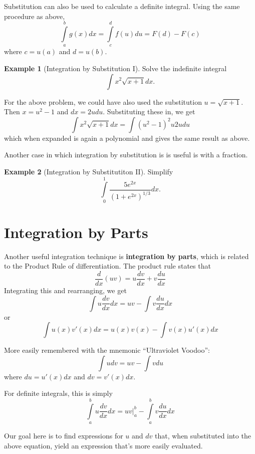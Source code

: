 \documentclass[
]{book}
\theoremstyle{definition}
\theoremstyle{definition}
\newtheorem{example}{Example}[chapter]
\theoremstyle{definition}
\theoremstyle{remark}
\begin{document}
Substitution can also be used to calculate a definite integral. Using the same procedure as above, \[\int\limits_a^b g(x)dx=\int\limits_c^d f(u)du = F(d)-F(c)\]
where \(c=u(a)\) and \(d=u(b)\).

\begin{example}[Integration by Substitution I]
\protect\hypertarget{exm:intsub1}{}{\label{exm:intsub1} {} }
Solve the indefinite integral \[\int x^2 \sqrt{x+1}dx.\]
\end{example}

For the above problem, we could have also used the substitution \(u=\sqrt{x+1}\). Then \(x=u^2-1\) and \(dx=2u du\). Substituting these in, we get \[\int x^2\sqrt{x+1}dx=\int (u^2-1)^2 u 2u du\] which when expanded is again a polynomial and gives the same result as above.

Another case in which integration by substitution is is useful is with a fraction.

\begin{example}[Integration by Substitutiton II]
\protect\hypertarget{exm:intsub2}{}{\label{exm:intsub2} {} }Simplify \[\int\limits_0^1 \frac{5e^{2x}}{(1+e^{2x})^{1/3}}dx.\]
\end{example}

\hypertarget{integration-by-parts}{%
\section{Integration by Parts}\label{integration-by-parts}}

Another useful integration technique is \textbf{integration by parts}, which is related to the Product Rule of differentiation. The product rule states that \[\frac{d}{dx}(uv)=u\frac{dv}{dx}+v\frac{du}{dx}\] Integrating this and rearranging, we get \[\int u\frac{dv}{dx}dx= u v - \int v \frac{du}{dx}dx\] or \[\int u(x) v'(x)dx=u(x)v(x) - \int v(x)u'(x)dx\]

More easily remembered with the mnemonic ``Ultraviolet Voodoo'': \[\int u dv = u v - \int v du\] where \(du=u'(x)dx\) and \(dv=v'(x)dx\).

For definite integrals, this is simply
\[\int\limits_a^b u\frac{dv}{dx}dx = \left. u v \right|_a^b - \int\limits_a^b v \frac{du}{dx}dx\]

Our goal here is to find expressions for \(u\) and \(dv\) that, when substituted into the above equation, yield an expression that's more easily evaluated.
\end{document}
